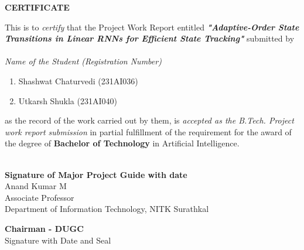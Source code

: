 \begin{framed}
	\begin{center}
		\textbf{{\Large CERTIFICATE}}
	\end{center}
	\null
	This is to \textit{certify} that the Project Work Report entitled \textit{\textbf{"Adaptive-Order State Transitions in Linear RNNs for Efficient State Tracking"}} submitted by \\
	\\
	\textit{Name of the Student (Registration Number)}
	\begin{enumerate}[label={(\arabic*)}]
		\item  Shashwat Chaturvedi (231AI036)
        \item  Utkarsh Shukla (231AI040)
	\end{enumerate}
	as the record of the work carried out by them, is \textit{accepted as the B.Tech. Project work report submission} in partial fulfillment of the requirement for the award of the degree of \textbf {Bachelor of Technology} in Artificial Intelligence.
	\\
    \\
	\begin{minipage}{14cm}
		\begin{center}                                      	\vspace{1.5cm}	
			\textbf{Signature of Major Project Guide with date}
            \\Anand Kumar M
            \\Associate Professor \\
			Department of Information Technology, NITK Surathkal \\
			\end{center}       
     \vspace{0.75cm}
        \begin{center}                                      	\vspace{1.5cm}	
			\textbf{Chairman - DUGC}
            \\{Signature with Date and Seal}
          	\end{center} 
	\end{minipage}
\\
\\
\\
\\
\\
\end{framed}
\thispagestyle{empty}
\clearpage
